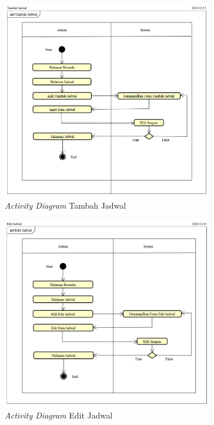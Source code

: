 \begin{figure}
	\centering
	\includegraphics[width=0.82\textwidth]{konten/gambar/activity-diagram/tambah-jadwal.png}
	\caption{\textit{Activity Diagram} Tambah Jadwal}
	\label{activity-diagram-tambah-jadwal}
\end{figure}

\begin{figure}
	\centering
	\includegraphics[width=0.82\textwidth]{konten/gambar/activity-diagram/edit-jadwal.png}
	\caption{\textit{Activity Diagram} Edit Jadwal}
	\label{activity-diagram-edit-jadwal}
\end{figure}

